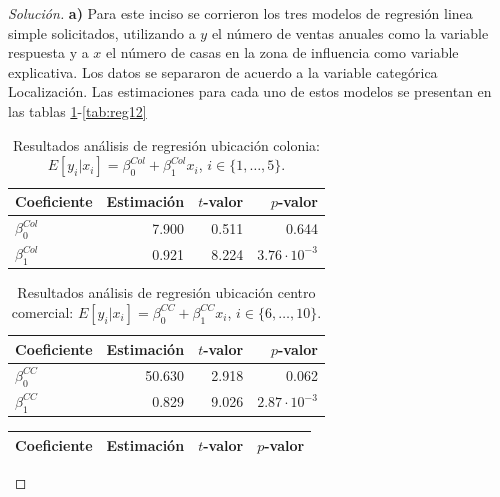 \documentclass[10.5pt,notitlepage]{article}
\newenvironment{solucion}
  {\begin{proof}[Solución]}
  {\end{proof}}
\theoremstyle{plain}
\begin{document}
\begin{solucion}
\noindent \textbf{a)} Para este inciso se corrieron los tres modelos de regresión linea simple solicitados, utilizando a \(y\) el número de ventas anuales como la variable respuesta y a \(x\) el número de casas en la zona de influencia como variable explicativa. Los datos se separaron de acuerdo a la variable categórica Localización. Las estimaciones para cada uno de estos modelos se presentan en las tablas \ref{tab:reg10}-\ref{tab:reg12}  
\begin{table}[H]
        \centering
        \begin{tabular}{@{}l@{\hskip 0.3in}r@{\hskip 0.3in}r@{\hskip 0.3in}r@{}}
            \toprule
            Coeficiente& Estimación & \(t\)-valor& \(p\)-valor \\
            \midrule
            \(\beta_{0}^{Col}\) &  7.900& 0.511 & 0.644\\
            \(\beta_{1}^{Col}\) & 0.921 &  8.224  &\(3.76\cdot 10^{-3}\)\\ 
            \bottomrule
        \end{tabular}
        \caption{Resultados análisis de regresión ubicación colonia: \(E[y_{i}|x_{i}] = \beta_{0}^{Col} + \beta_{1}^{Col}x_{i}\), \(i \in \{1,\hdots,5\}\).}
        \label{tab:reg10}
\end{table}
\begin{table}[H]
        \centering
        \begin{tabular}{@{}l@{\hskip 0.3in}r@{\hskip 0.3in}r@{\hskip 0.3in}r@{}}
            \toprule
            Coeficiente& Estimación & \(t\)-valor& \(p\)-valor \\
            \midrule
            \(\beta_{0}^{CC}\) & 50.630&  2.918 & 0.062\\
            \(\beta_{1}^{CC}\) & 0.829 &   9.026& \(2.87\cdot 10^{-3}\)\\
            \bottomrule
        \end{tabular}
        \caption{Resultados análisis de regresión ubicación centro comercial: \(E[y_{i}|x_{i}] = \beta_{0}^{CC} + \beta_{1}^{CC}x_{i}\), \(i \in \{6,\hdots,10\}\).}
        \label{tab:reg11}
\end{table}
\begin{table}[H]
        \centering
        \begin{tabular}{@{}l@{\hskip 0.3in}r@{\hskip 0.3in}r@{\hskip 0.3in}r@{}}
            \toprule
            Coeficiente& Estimación & \(t\)-valor& \(p\)-valor \\
            \midrule

\end{tabular}
\end{table}
\end{solucion}
\end{document}
